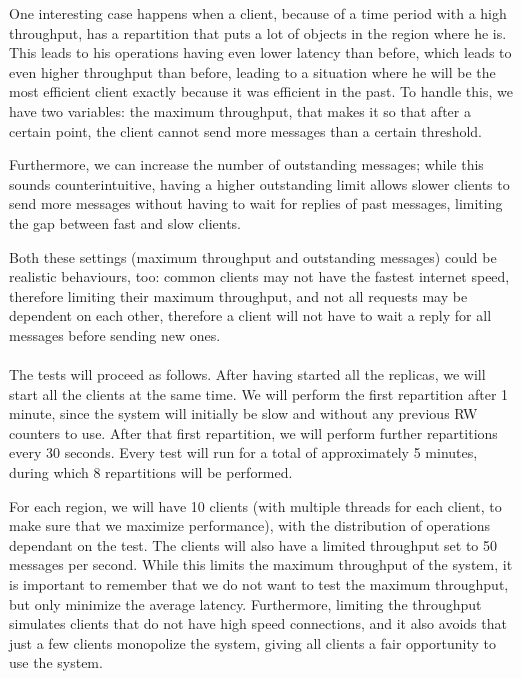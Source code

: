One interesting case happens when a client, because of a time period with a high throughput, has a repartition that puts a lot of objects in the region where he is. This leads to his operations having even lower latency than before, which leads to even higher throughput than before, leading to a situation where he will be the most efficient client exactly because it was efficient in the past. To handle this, we have two variables: the maximum throughput, that makes it so that after a certain point, the client cannot send more messages than a certain threshold.

Furthermore, we can increase the number of outstanding messages; while this sounds counterintuitive, having a higher outstanding limit allows slower clients to send more messages without having to wait for replies of past messages, limiting the gap between fast and slow clients.

Both these settings (maximum throughput and outstanding messages) could be realistic behaviours, too: common clients may not have the fastest internet speed, therefore limiting their maximum throughput, and not all requests may be dependent on each other, therefore a client will not have to wait a reply for all messages before sending new ones.
\\\\
The tests will proceed as follows. After having started all the replicas, we will start all the clients at the same time. We will perform the first repartition after 1 minute, since the system will initially be slow and without any previous RW counters to use. After that first repartition, we will perform further repartitions every 30 seconds. Every test will run for a total of approximately 5 minutes, during which 8 repartitions will be performed.

For each region, we will have 10 clients (with multiple threads for each client, to make sure that we maximize performance), with the distribution of operations dependant on the test. The clients will also have a limited throughput set to 50 messages per second. While this limits the maximum throughput of the system, it is important to remember that we do not want to test the maximum throughput, but only minimize the average latency. Furthermore, limiting the throughput simulates clients that do not have high speed connections, and it also avoids that just a few clients monopolize the system, giving all clients a fair opportunity to use the system.

